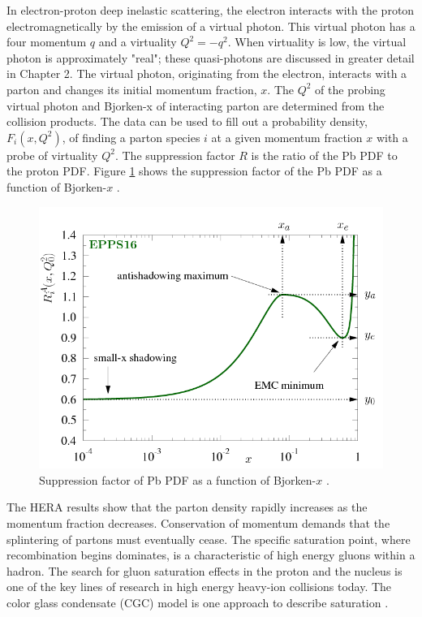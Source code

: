 In electron-proton deep inelastic scattering, the electron interacts with the proton electromagnetically by the emission of a virtual photon. This virtual photon has a four momentum $q$ and a virtuality $Q^2 = - q^2$. When virtuality is low, the virtual photon is approximately "real"; these quasi-photons are discussed in greater detail in Chapter 2. The virtual photon, originating from the electron, interacts with a parton and changes its initial momentum fraction, $x$. The $Q^2$ of the probing virtual photon and Bjorken-x of interacting parton are determined from the collision products. The data can be used to fill out a probability density, $F_i(x, Q^2)$, of finding a parton species $i$ at a given momentum fraction $x$ with a probe of virtuality $Q^2$. The suppression factor $R$ is the ratio of the Pb PDF to the proton PDF. Figure \ref{fig:f2Supp} shows the suppression factor of the Pb PDF as a function of Bjorken-$x$ \cite{Paakkinen:2018zbs}.

\begin{figure}[h!]
\begin{centering}
\includegraphics[width=5in]{Chapter1/importfigs/FitForm_EPPS16.png}
\par\end{centering}
\caption{Suppression factor of Pb PDF as a function of Bjorken-$x$ \cite{Paakkinen:2018zbs}. \label{fig:f2Supp}}
\end{figure}

The HERA results show that the parton density rapidly increases as the momentum fraction decreases. Conservation of momentum demands that the splintering of partons must eventually cease. The specific saturation point, where recombination begins dominates, is a characteristic of high energy gluons within a hadron. The search for gluon saturation effects in the proton and the nucleus is one of the key lines of research in high energy heavy-ion collisions today. The color glass condensate (CGC) model is one approach to describe saturation \cite{CGC2Lec}.

